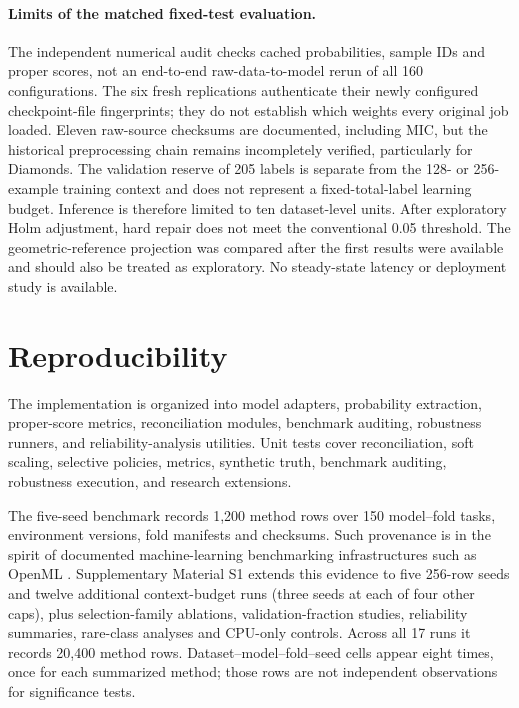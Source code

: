 \documentclass[a4paper,fleqn]{cas-sc}
\begin{document}
\paragraph{Limits of the matched fixed-test evaluation.}
The independent numerical audit checks cached probabilities, sample IDs and proper scores, not an end-to-end raw-data-to-model rerun of all 160 configurations. The six fresh replications authenticate their newly configured checkpoint-file fingerprints; they do not establish which weights every original job loaded. Eleven raw-source checksums are documented, including MIC, but the historical preprocessing chain remains incompletely verified, particularly for Diamonds. The validation reserve of 205 labels is separate from the 128- or 256-example training context and does not represent a fixed-total-label learning budget. Inference is therefore limited to ten dataset-level units. After exploratory Holm adjustment, hard repair does not meet the conventional 0.05 threshold. The geometric-reference projection was compared after the first results were available and should also be treated as exploratory. No steady-state latency or deployment study is available.

\section{Reproducibility}
The implementation is organized into model adapters, probability extraction, proper-score metrics, reconciliation modules, benchmark auditing, robustness runners, and reliability-analysis utilities. Unit tests cover reconciliation, soft scaling, selective policies, metrics, synthetic truth, benchmark auditing, robustness execution, and research extensions.

The five-seed benchmark records 1,200 method rows over 150 model--fold tasks, environment versions, fold manifests and checksums. Such provenance is in the spirit of documented machine-learning benchmarking infrastructures such as OpenML \citep{vanschoren2014openml}. Supplementary Material S1 extends this evidence to five 256-row seeds and twelve additional context-budget runs (three seeds at each of four other caps), plus selection-family ablations, validation-fraction studies, reliability summaries, rare-class analyses and CPU-only controls. Across all 17 runs it records 20,400 method rows. Dataset--model--fold--seed cells appear eight times, once for each summarized method; those rows are not independent observations for significance tests.
\end{document}
